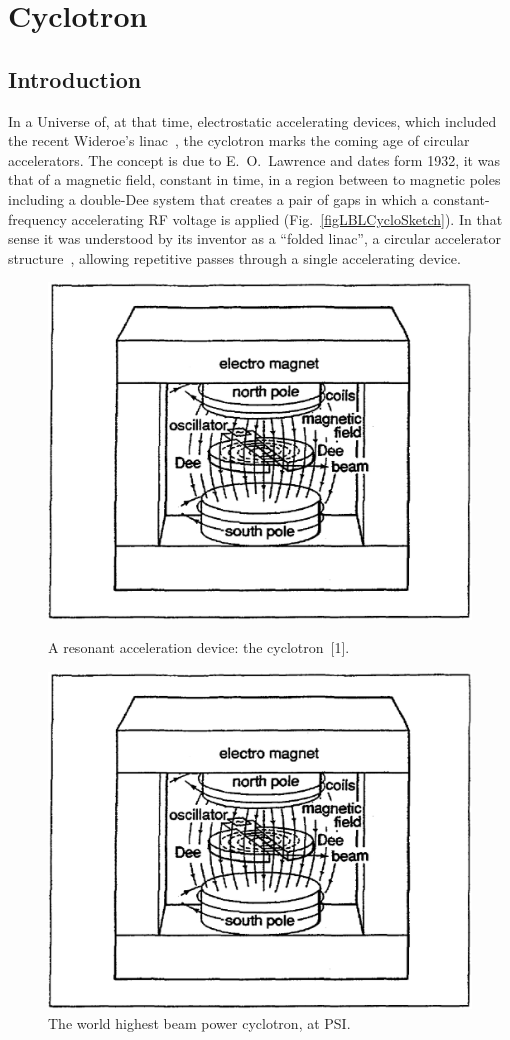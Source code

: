 



\chapter[Cyclotron]{Cyclotron}\label{chapCyclotron}


\section{Introduction \label{secCycloIntro}}

In a Universe of, at that time, electrostatic accelerating devices, which included the recent Wideroe's linac~\cite{TBRef'd},  
the cyclotron marks the coming age of circular accelerators. The concept is due to E.~O.~Lawrence and dates form 1932, 
it was  that of a  magnetic field, constant in time, in a region between to magnetic poles 
including a double-Dee system that creates a pair of  gaps in which a 
constant-frequency accelerating RF voltage is applied (Fig.~\ref{figLBLCycloSketch}).  
In that sense it was understood by its inventor as a  ``folded linac'', 
a circular accelerator structure~\cite{TBRef'd},  
allowing  repetitive  passes through a single accelerating device. 


\begin{figure}[ht]
\centering
\sidebyside
{
    \includegraphics[width=0.45\linewidth]{./figs_cyclo/LBLCycloSketch.eps}
    \caption{A  resonant acceleration device: the cyclotron~[1].} %
\label{figLBLCycloSketch}
}{
    \includegraphics[width=0.45\linewidth]{./figs_cyclo/LBLCycloSketch.eps}
    \caption{     The world highest beam power cyclotron, at PSI.}
\label{figPSICyclo}
}
\end{figure}

